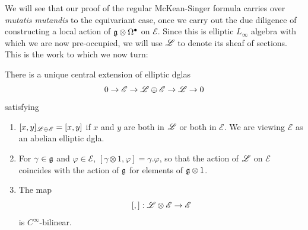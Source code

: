 \documentclass[11pt]{amsart}
\newcommand{\E}{\mscr{E}}
\newcommand{\mscr}{\mathscr}
\numberwithin{equation}{section}
\newcommand{\cinfty}{C^{\infty}}
\begin{document}
We will see that our proof of the regular McKean-Singer formula carries over \textit{mutatis mutandis} to the equivariant case, once we carry out the due diligence of constructing a local action of $\mathfrak g\otimes \Omega^\bullet$ on $\E$. Since this is elliptic $L_\infty$ algebra with which we are now pre-occupied, we will use $\mathscr L$ to denote its sheaf of sections. This is the work to which we now turn:
\begin{proposition}
There is a unique central extension of elliptic dglas 
\[
0\to \E \to \sL \oplus \E \to \sL \to 0
\]
satisfying 
\begin{enumerate}
\item $[x,y]_{\sL\oplus \E}=[x,y]$ if $x$ and $y$ are both in $\mathscr L$ or both in $\E$. We are viewing $\E$ as an abelian elliptic dgla.
\item For $\gamma\in \mathfrak g$ and $\varphi\in \E$, $[\gamma\otimes 1, \varphi] = \gamma.\varphi$, so that the action of $\mathscr L$ on $\E$ coincides with the action of $\mathfrak g$ for elements of $\mathfrak g\otimes 1$.
\item The map
\[
[,]: \sL \otimes \E \to \E
\]
is $\cinfty$-bilinear.
\end{enumerate}
\end{proposition}
\end{document}
